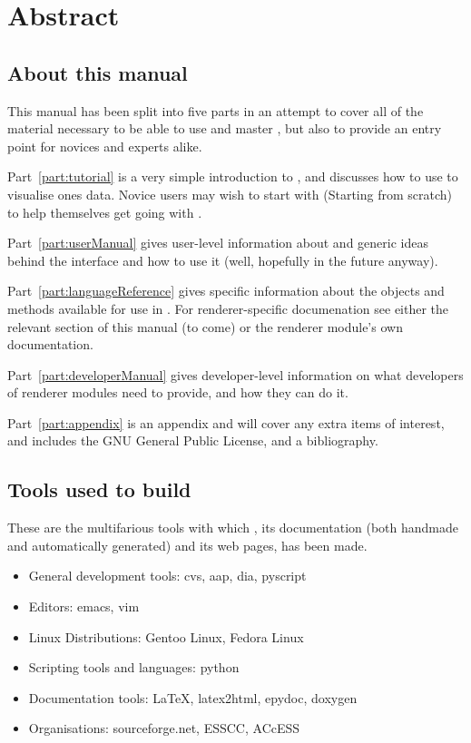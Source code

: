 
\chapter*{Abstract}

\section*{About this manual}

This manual has been split into five parts in an attempt to cover all of the
material necessary to be able to use and master \pyvisi, but also to provide an
entry point for novices and experts alike.

Part~\ref{part:tutorial} is a very simple introduction to \pyvisi, and
discusses how to use \pyvisi to visualise ones data.  Novice users may wish to
start with  (Starting from scratch) to help
themselves get going with \pyvisi.  

Part~\ref{part:userManual} gives user-level information about \pyvisi and
generic ideas behind the interface and how to use it (well, hopefully in the
future anyway).

Part~\ref{part:languageReference} gives specific information about the objects
and methods available for use in \pyvisi.  For renderer-specific documenation
see either the relevant section of this manual (to come) or the renderer
module's own documentation.

Part~\ref{part:developerManual} gives developer-level information on what
developers of renderer modules need to provide, and how they can do it.

Part~\ref{part:appendix} is an appendix and will cover any extra items of
interest, and includes the GNU General Public License, and a bibliography.

\section*{Tools used to build \pyvisi}

These are the multifarious tools with which \pyvisi, its documentation (both
handmade and automatically generated) and its web pages, has been made.

\begin{itemize}
\item General development tools: cvs, aap, dia, pyscript
\item Editors: emacs, vim
\item Linux Distributions: Gentoo Linux, Fedora Linux
\item Scripting tools and languages: python
\item Documentation tools: \LaTeX, latex2html, epydoc, doxygen
\item Organisations: sourceforge.net, ESSCC, ACcESS
\end{itemize}

